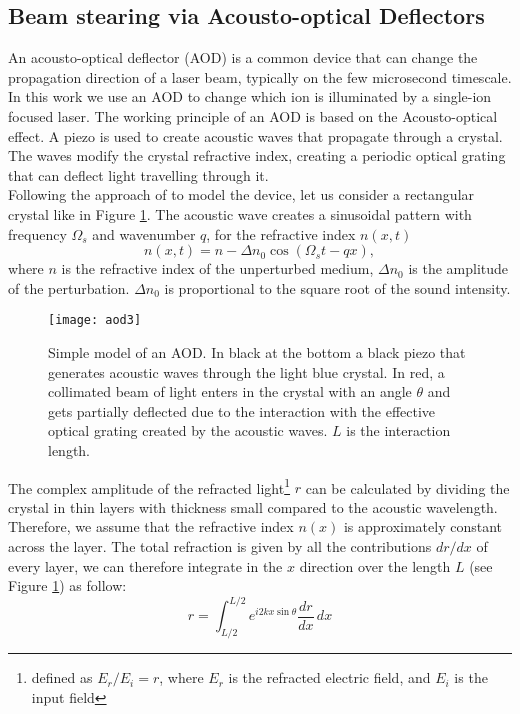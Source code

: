 \subsection{Beam stearing via Acousto-optical Deflectors}
\label{theory_AOD}
An acousto-optical deflector (AOD) is a common device that can change the propagation direction of a laser beam, typically on the few microsecond timescale. In this work we use an AOD to change which ion is illuminated by a single-ion focused laser. The working principle of an AOD is based on the Acousto-optical effect. A piezo is used to create acoustic waves that propagate through a crystal. The waves modify the crystal refractive index, creating a periodic optical grating that can deflect light travelling through it.  \\
Following the approach of \cite{saleh} to model the device, let us consider a rectangular crystal like in Figure \ref{AOD}. The acoustic wave creates a sinusoidal pattern with frequency $\Omega_s$ and wavenumber $q$, for the refractive index $n(x,t)$
\begin{equation}
n(x,t) = n - \Delta n_0 \cos \left(\Omega_s t - qx \right),
\end{equation}
where $n$ is the refractive index of the unperturbed medium, $\Delta n_0$ is the amplitude of the perturbation. $\Delta n_0$ is proportional to the square root of the sound intensity.
\begin{figure}
\centering
\texttt{[image: aod3]}
\caption{Simple model of an AOD. In black at the bottom a black piezo that generates acoustic waves through the light blue crystal. In red, a collimated beam of light enters in the crystal with an angle $\theta$ and gets partially deflected due to the interaction with the effective optical grating created by the acoustic waves. $L$ is the interaction length.}
\label{AOD}
\end{figure}
The complex amplitude of the refracted light\footnote{defined as $E_r/E_i = r$, where $E_r$ is the refracted electric field, and $E_i$ is the input field} $r$ can be calculated by dividing the crystal in thin layers with thickness small compared to the acoustic wavelength. Therefore, we assume that the refractive index $n(x)$ is approximately constant across the layer. The total refraction is given by all the contributions $dr/dx$ of every layer, we can therefore integrate in the $x$ direction over the length $L$ (see Figure \ref{AOD}) as follow:
\begin{equation}
r = \int_{L/2}^{L/2} e^{i2kx \sin\theta} \frac{dr}{dx} \,dx
\end{equation}
